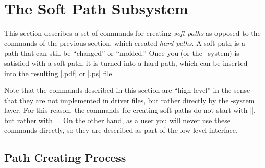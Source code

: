 %

\section{The Soft Path Subsystem}

\label{section-soft-paths}

\makeatletter


This section describes a set of commands for creating \emph{soft
  paths} as opposed to the commands of the previous section, which
created \emph{hard paths}. A soft path is a path that can still be
``changed'' or ``molded.'' Once you (or the \pgfname\ system) is
satisfied with a soft path, it is turned into a hard path, which can
be inserted into the resulting |.pdf| or |.ps| file.

Note that the commands described in this section are ``high-level'' in
the sense that they are not implemented in driver files, but rather
directly by the \pgfname-system layer. For this reason, the commands for
creating soft paths do not start with |\pgfsys@|, but rather with
|\pgfsyssoftpath@|. On the other hand, as a user you will never use
these commands directly, so they are described as part of the
low-level interface. 



\subsection{Path Creating Process}

